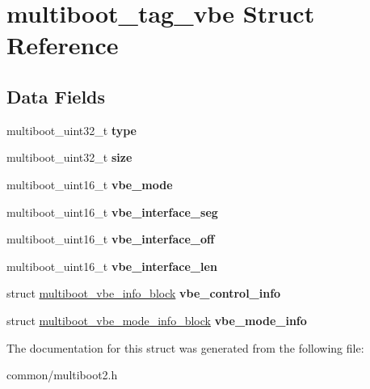 \hypertarget{structmultiboot__tag__vbe}{}\section{multiboot\+\_\+tag\+\_\+vbe Struct Reference}
\label{structmultiboot__tag__vbe}
\subsection*{Data Fields}
\begin{DoxyCompactItemize}
\item 
multiboot\+\_\+uint32\+\_\+t {\bfseries type}\hypertarget{structmultiboot__tag__vbe_ae62ae4e67848d1ab403a238360e1deb1}{}\label{structmultiboot__tag__vbe_ae62ae4e67848d1ab403a238360e1deb1}

\item 
multiboot\+\_\+uint32\+\_\+t {\bfseries size}\hypertarget{structmultiboot__tag__vbe_a028c31ca8aaf99167265efe064311e98}{}\label{structmultiboot__tag__vbe_a028c31ca8aaf99167265efe064311e98}

\item 
multiboot\+\_\+uint16\+\_\+t {\bfseries vbe\+\_\+mode}\hypertarget{structmultiboot__tag__vbe_a3d8f77830f0e010b34939f4eeb24e64d}{}\label{structmultiboot__tag__vbe_a3d8f77830f0e010b34939f4eeb24e64d}

\item 
multiboot\+\_\+uint16\+\_\+t {\bfseries vbe\+\_\+interface\+\_\+seg}\hypertarget{structmultiboot__tag__vbe_a72d62afb2de739a3e651aac357069abe}{}\label{structmultiboot__tag__vbe_a72d62afb2de739a3e651aac357069abe}

\item 
multiboot\+\_\+uint16\+\_\+t {\bfseries vbe\+\_\+interface\+\_\+off}\hypertarget{structmultiboot__tag__vbe_a1370d764136d9cde9132c71ebf54bc3e}{}\label{structmultiboot__tag__vbe_a1370d764136d9cde9132c71ebf54bc3e}

\item 
multiboot\+\_\+uint16\+\_\+t {\bfseries vbe\+\_\+interface\+\_\+len}\hypertarget{structmultiboot__tag__vbe_a513fc2ea3224e91c0870165152d989e1}{}\label{structmultiboot__tag__vbe_a513fc2ea3224e91c0870165152d989e1}

\item 
struct \hyperlink{structmultiboot__vbe__info__block}{multiboot\+\_\+vbe\+\_\+info\+\_\+block} {\bfseries vbe\+\_\+control\+\_\+info}\hypertarget{structmultiboot__tag__vbe_a057304e943e881731680e06472c4bf1e}{}\label{structmultiboot__tag__vbe_a057304e943e881731680e06472c4bf1e}

\item 
struct \hyperlink{structmultiboot__vbe__mode__info__block}{multiboot\+\_\+vbe\+\_\+mode\+\_\+info\+\_\+block} {\bfseries vbe\+\_\+mode\+\_\+info}\hypertarget{structmultiboot__tag__vbe_a386399d7efb3952f08693fb0f5242bd9}{}\label{structmultiboot__tag__vbe_a386399d7efb3952f08693fb0f5242bd9}

\end{DoxyCompactItemize}


The documentation for this struct was generated from the following file\+:\begin{DoxyCompactItemize}
\item 
common/multiboot2.\+h\end{DoxyCompactItemize}
